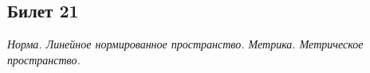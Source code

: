 \subsection{Билет 21}

\textit{Норма. Линейное нормированное пространство. Метрика. Метрическое пространство.}